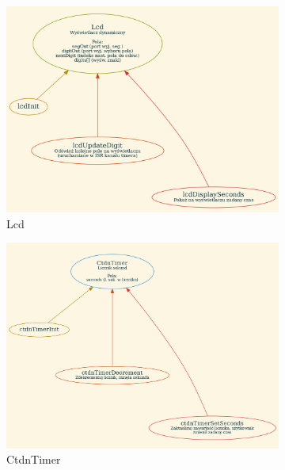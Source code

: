 \documentclass[fleqn]{article}
\begin{document}
\begin{figure}[H]
	\centering
	\begin{subfigure}[b]{0.49\textwidth}
		\includegraphics[width=\textwidth]{assets/g_lcd.png}
		\caption{Lcd}
	\end{subfigure}\hfill
	\begin{subfigure}[b]{0.49\textwidth}
		\includegraphics[width=\textwidth]{assets/g_ctdntimer.png}
		\caption{CtdnTimer}
	\end{subfigure}
	\par\bigskip
	\centering
	\begin{subfigure}[b]{0.49\textwidth}

\end{subfigure}
\end{figure}
\end{document}
